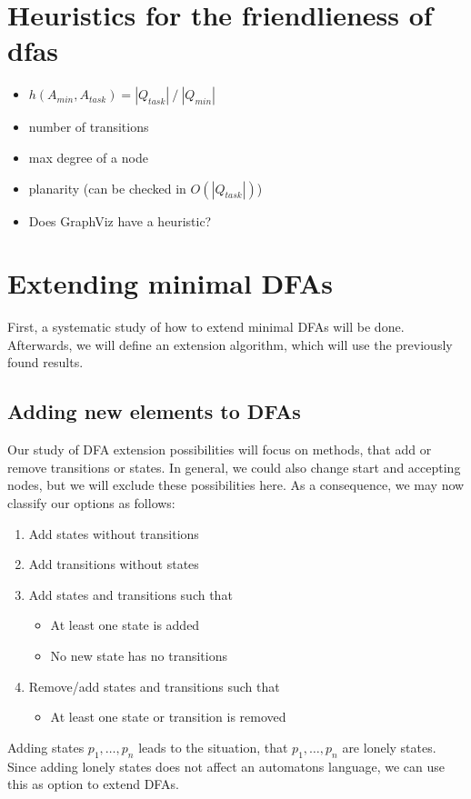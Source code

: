 \documentclass[a4paper, oneside, 11pt]{report}
\begin{document}
\chapter{Heuristics for the friendlieness of dfas}

\begin{itemize}
	\item $h(A_{min}, A_{task}) = |Q_{task}|\ /\ |Q_{min}|$
	\item number of transitions
	\item max degree of a node
	\item planarity (can be checked in $O(|Q_{task}|)$)
	\item Does GraphViz have a heuristic?
\end{itemize}


\chapter{Extending minimal DFAs}

First, a systematic study of how to extend minimal DFAs will be done. Afterwards, we will define an extension algorithm, which will use the previously found results.

\section{Adding new elements to DFAs}

Our study of DFA extension possibilities will focus on methods, that add or remove transitions or states. In general, we could also change start and accepting nodes, but we will exclude these possibilities here. As a consequence, we may now classify our options as follows:
\begin{enumerate}
	\item Add states without transitions
	\item Add transitions without states
	\item Add states and transitions such that
	\begin{itemize}
		\item At least one state is added
		\item No new state has no transitions
	\end{itemize}
	\item Remove/add states and transitions such that
	\begin{itemize}
		\item At least one state or transition is removed
	\end{itemize}
\end{enumerate}
Adding states $p_1, \ldots, p_n$ leads to the situation, that $p_1, \ldots, p_n$ are lonely states. Since adding lonely states does not affect an automatons language, we can use this as option to extend DFAs.
\end{document}
